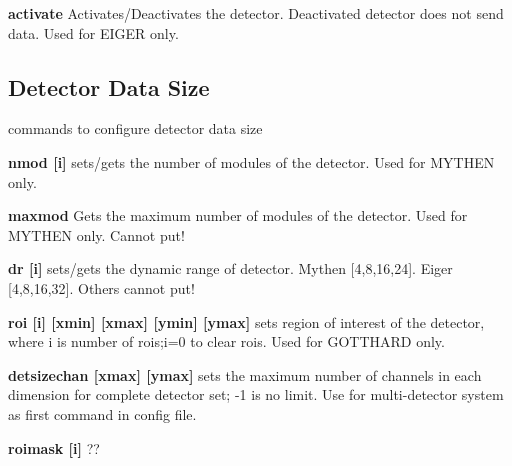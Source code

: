\begin{DoxyItemize}
\item {\bfseries activate} Activates/Deactivates the detector. Deactivated detector does not send data. Used for EIGER only.
\end{DoxyItemize}\hypertarget{config_detsize}{}\subsection{Detector Data Size}\label{config_detsize}
commands to configure detector data size


\begin{DoxyItemize}
\item {\bfseries nmod \mbox{[}i\mbox{]}} sets/gets the number of modules of the detector. Used for MYTHEN only.
\end{DoxyItemize}


\begin{DoxyItemize}
\item {\bfseries maxmod } Gets the maximum number of modules of the detector. Used for MYTHEN only. Cannot put!
\end{DoxyItemize}


\begin{DoxyItemize}
\item {\bfseries dr \mbox{[}i\mbox{]}} sets/gets the dynamic range of detector. Mythen \mbox{[}4,8,16,24\mbox{]}. Eiger \mbox{[}4,8,16,32\mbox{]}. Others cannot put!
\end{DoxyItemize}


\begin{DoxyItemize}
\item {\bfseries roi \mbox{[}i\mbox{]} \mbox{[}xmin\mbox{]} \mbox{[}xmax\mbox{]} \mbox{[}ymin\mbox{]} \mbox{[}ymax\mbox{]} } sets region of interest of the detector, where i is number of rois;i=0 to clear rois. Used for GOTTHARD only.
\end{DoxyItemize}


\begin{DoxyItemize}
\item {\bfseries detsizechan \mbox{[}xmax\mbox{]} \mbox{[}ymax\mbox{]}} sets the maximum number of channels in each dimension for complete detector set; -\/1 is no limit. Use for multi-\/detector system as first command in config file.
\end{DoxyItemize}


\begin{DoxyItemize}
\item {\bfseries roimask \mbox{[}i\mbox{]}} ??
\end{DoxyItemize}


